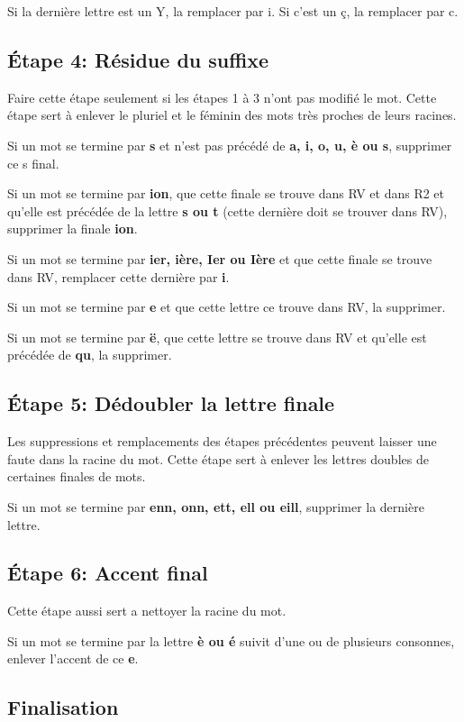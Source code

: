 Si la dernière lettre est un Y, la remplacer par i.
Si c'est un ç, la remplacer par c.

\subsection*{Étape 4: Résidue du suffixe}

Faire cette étape seulement si les étapes 1 à 3 n'ont pas modifié le mot.
Cette étape sert à enlever le pluriel et le féminin des mots très proches de leurs racines.

Si un mot se termine par \textbf{s} et n'est pas précédé de \textbf{a, i, o, u, è ou s}, supprimer ce s final.

Si un mot se termine par \textbf{ion}, que cette finale se trouve dans RV et dans R2 et qu'elle est précédée de la lettre \textbf{s ou t} (cette dernière doit se trouver dans RV), supprimer la finale \textbf{ion}.

Si un mot se termine par \textbf{ier, ière, Ier ou Ière} et que cette finale se trouve dans RV, remplacer cette dernière par \textbf{i}.

Si un mot se termine par \textbf{e} et que cette lettre ce trouve dans RV, la supprimer.

Si un mot se termine par \textbf{ë}, que cette lettre se trouve dans RV et qu'elle est précédée de \textbf{qu}, la supprimer.

\subsection*{Étape 5: Dédoubler la lettre finale}

Les suppressions et remplacements des étapes précédentes peuvent laisser une faute dans la racine du mot.
Cette étape sert à enlever les lettres doubles de certaines finales de mots.

Si un mot se termine par \textbf{enn, onn, ett, ell ou eill}, supprimer la dernière lettre.

\subsection*{Étape 6: Accent final}

Cette étape aussi sert a nettoyer la racine du mot.

Si un mot se termine par la lettre \textbf{è ou é} suivit d'une ou de plusieurs consonnes, enlever l'accent de ce \textbf{e}.

\subsection*{Finalisation}

